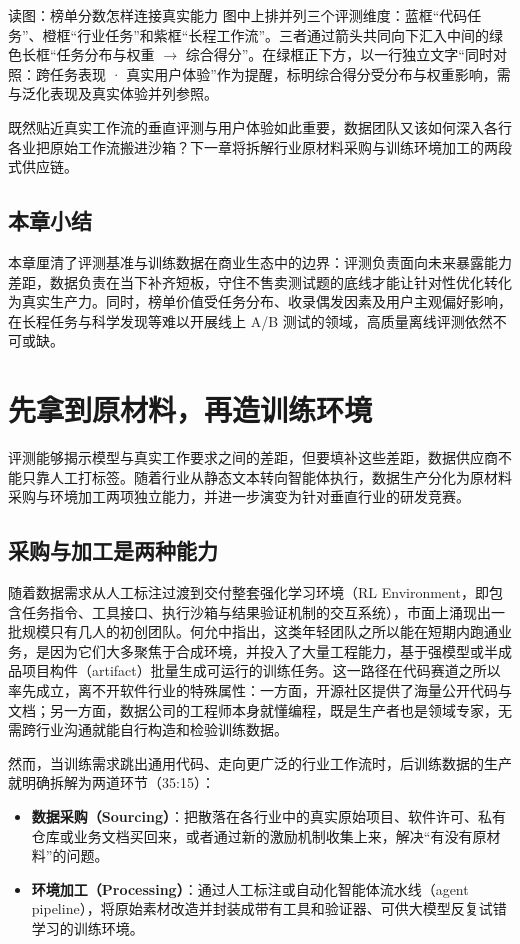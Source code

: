 \documentclass[UTF8,a4paper,11pt,fontset=fandol]{ctexart}
\begin{document}
\begin{knowledgebox}{读图：榜单分数怎样连接真实能力}
图中上排并列三个评测维度：蓝框“代码任务”、橙框“行业任务”和紫框“长程工作流”。三者通过箭头共同向下汇入中间的绿色长框“任务分布与权重 \ensuremath{\rightarrow} 综合得分”。在绿框正下方，以一行独立文字“同时对照：跨任务表现 · 真实用户体验”作为提醒，标明综合得分受分布与权重影响，需与泛化表现及真实体验并列参照。
\end{knowledgebox}
既然贴近真实工作流的垂直评测与用户体验如此重要，数据团队又该如何深入各行各业把原始工作流搬进沙箱？下一章将拆解行业原材料采购与训练环境加工的两段式供应链。
\subsection{本章小结}
本章厘清了评测基准与训练数据在商业生态中的边界：评测负责面向未来暴露能力差距，数据负责在当下补齐短板，守住不售卖测试题的底线才能让针对性优化转化为真实生产力。同时，榜单价值受任务分布、收录偶发因素及用户主观偏好影响，在长程任务与科学发现等难以开展线上 A/B 测试的领域，高质量离线评测依然不可或缺。
\section{先拿到原材料，再造训练环境}
评测能够揭示模型与真实工作要求之间的差距，但要填补这些差距，数据供应商不能只靠人工打标签。随着行业从静态文本转向智能体执行，数据生产分化为原材料采购与环境加工两项独立能力，并进一步演变为针对垂直行业的研发竞赛。
\subsection{采购与加工是两种能力}
随着数据需求从人工标注过渡到交付整套强化学习环境（RL Environment，即包含任务指令、工具接口、执行沙箱与结果验证机制的交互系统），市面上涌现出一批规模只有几人的初创团队。何允中指出，这类年轻团队之所以能在短期内跑通业务，是因为它们大多聚焦于合成环境，并投入了大量工程能力，基于强模型或半成品项目构件（artifact）批量生成可运行的训练任务。这一路径在代码赛道之所以率先成立，离不开软件行业的特殊属性：一方面，开源社区提供了海量公开代码与文档；另一方面，数据公司的工程师本身就懂编程，既是生产者也是领域专家，无需跨行业沟通就能自行构造和检验训练数据。

然而，当训练需求跳出通用代码、走向更广泛的行业工作流时，后训练数据的生产就明确拆解为两道环节（35:15）：
\begin{itemize}
\item \textbf{数据采购（Sourcing）}：把散落在各行业中的真实原始项目、软件许可、私有仓库或业务文档买回来，或者通过新的激励机制收集上来，解决“有没有原材料”的问题。
\item \textbf{环境加工（Processing）}：通过人工标注或自动化智能体流水线（agent pipeline），将原始素材改造并封装成带有工具和验证器、可供大模型反复试错学习的训练环境。
\end{itemize}
\end{document}
